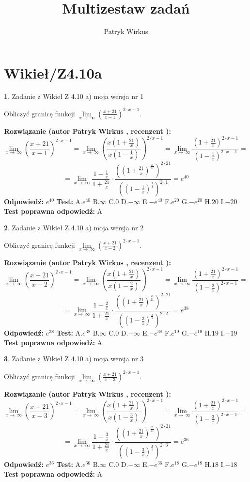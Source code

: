 \documentclass[12pt, a4paper]{article}
\title{Multizestaw zadań}
\author{Patryk Wirkus}
\date{}
\theoremstyle{definition} %
\newtheorem{zad}{}
\newcommand{\kategoria}[1]{\section{#1}}
\newcommand{\zadStart}[1]{\begin{zad}#1\newline}
\newcommand{\zadStop}{\end{zad}}
\newcommand{\rozwStart}[2]{\noindent \textbf{Rozwiązanie (autor #1 , recenzent #2): }\newline}
\newcommand{\rozwStop}{\newline}
\newcommand{\odpStart}{\noindent \textbf{Odpowiedź:}\newline}
\newcommand{\odpStop}{\newline}
\newcommand{\testStart}{\noindent \textbf{Test:}\newline}
\newcommand{\testStop}{\newline}
\newcommand{\kluczStart}{\noindent \textbf{Test poprawna odpowiedź:}\newline}
\newcommand{\kluczStop}{\newline}
\begin{document}
\maketitle

\kategoria{Wikieł/Z4.10a}


\zadStart{Zadanie z Wikieł Z 4.10 a) moja wersja nr 1}

Obliczyć granicę funkcji  $\lim\limits_{x\to\ \infty}(\frac{x+21}{x-1})^{2\cdot x-1}$.
\zadStop
\rozwStart{Patryk Wirkus}{}
$$\lim\limits_{x\to\ \infty}(\frac{x+21}{x-1})^{2\cdot x-1} = \lim\limits_{x\to\ \infty}(\frac{x(1+\frac{21}{x})}{x(1-\frac{1}{x})})^{2\cdot x-1}=\lim\limits_{x\to\ \infty}\frac{(1+\frac{21}{x})^{2\cdot x-1}}{(1-\frac{1}{x})^{2\cdot x-1}}=$$
$$=\lim\limits_{x\to\ \infty}\frac{1-\frac{1}{x}}{1+\frac{21}{x}}\cdot\frac{((1+\frac{21}{x})^{\frac{x}{21}})^{2\cdot21}}{((1-\frac{1}{x})^{\frac{x}{1}})^{2\cdot1}}=e^{40}$$
\rozwStop
\odpStart
$e^{40}$
\odpStop
\testStart
A.$e^{40}$ B.$\infty$ C.$0$ D.$-\infty$ E.$-e^{40}$
F.$e^{20}$ G.$-e^{20}$
H.$20$
I.$-20$
\testStop
\kluczStart
A
\kluczStop



\zadStart{Zadanie z Wikieł Z 4.10 a) moja wersja nr 2}

Obliczyć granicę funkcji  $\lim\limits_{x\to\ \infty}(\frac{x+21}{x-2})^{2\cdot x-1}$.
\zadStop
\rozwStart{Patryk Wirkus}{}
$$\lim\limits_{x\to\ \infty}(\frac{x+21}{x-2})^{2\cdot x-1} = \lim\limits_{x\to\ \infty}(\frac{x(1+\frac{21}{x})}{x(1-\frac{2}{x})})^{2\cdot x-1}=\lim\limits_{x\to\ \infty}\frac{(1+\frac{21}{x})^{2\cdot x-1}}{(1-\frac{2}{x})^{2\cdot x-1}}=$$
$$=\lim\limits_{x\to\ \infty}\frac{1-\frac{2}{x}}{1+\frac{21}{x}}\cdot\frac{((1+\frac{21}{x})^{\frac{x}{21}})^{2\cdot21}}{((1-\frac{2}{x})^{\frac{x}{2}})^{2\cdot2}}=e^{38}$$
\rozwStop
\odpStart
$e^{38}$
\odpStop
\testStart
A.$e^{38}$ B.$\infty$ C.$0$ D.$-\infty$ E.$-e^{38}$
F.$e^{19}$ G.$-e^{19}$
H.$19$
I.$-19$
\testStop
\kluczStart
A
\kluczStop



\zadStart{Zadanie z Wikieł Z 4.10 a) moja wersja nr 3}

Obliczyć granicę funkcji  $\lim\limits_{x\to\ \infty}(\frac{x+21}{x-3})^{2\cdot x-1}$.
\zadStop
\rozwStart{Patryk Wirkus}{}
$$\lim\limits_{x\to\ \infty}(\frac{x+21}{x-3})^{2\cdot x-1} = \lim\limits_{x\to\ \infty}(\frac{x(1+\frac{21}{x})}{x(1-\frac{3}{x})})^{2\cdot x-1}=\lim\limits_{x\to\ \infty}\frac{(1+\frac{21}{x})^{2\cdot x-1}}{(1-\frac{3}{x})^{2\cdot x-1}}=$$
$$=\lim\limits_{x\to\ \infty}\frac{1-\frac{3}{x}}{1+\frac{21}{x}}\cdot\frac{((1+\frac{21}{x})^{\frac{x}{21}})^{2\cdot21}}{((1-\frac{3}{x})^{\frac{x}{3}})^{2\cdot3}}=e^{36}$$
\rozwStop
\odpStart
$e^{36}$
\odpStop
\testStart
A.$e^{36}$ B.$\infty$ C.$0$ D.$-\infty$ E.$-e^{36}$
F.$e^{18}$ G.$-e^{18}$
H.$18$
I.$-18$
\testStop
\kluczStart
A
\kluczStop
\end{document}
